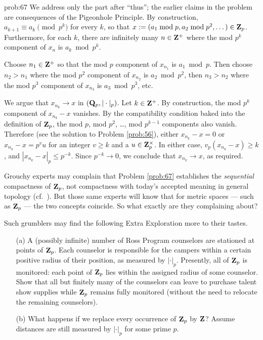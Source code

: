 \begin{sol}{prob:67} We address only the part after ``thus''; the earlier claims in the problem are consequences of the Pigeonhole Principle. By construction, $a_{k+1}\equiv a_k \pmod{p^k}$ for every $k$, so that $x:=(a_1\bmod{p},a_2\bmod{p^2},\dots) \in \mathbf{Z}_p$. Furthermore, for each $k$, there are infinitely many $n \in \mathbf{Z}^{+}$ where the mod $p^k$ component of $x_n$ is $a_k\bmod{p^k}$. 

Choose $n_1 \in \mathbf{Z}^{+}$ so that the mod $p$ component of $x_{n_1}$ is $a_1\bmod{p}$. Then choose $n_2 > n_1$ where the mod $p^2$ component of $x_{n_2}$ is $a_2\bmod{p^2}$, then $n_3 > n_2$ where the mod $p^3$ component of $x_{n_3}$ is $a_3\bmod{p^3}$, etc. 

We argue that $x_{n_k} \to x$ in $(\mathbf{Q}_p,|\cdot|_{p})$. Let $k \in \mathbf{Z}^{+}$. By construction, the mod $p^k$ component of $x_{n_k}-x$ vanishes. By the compatibility condition baked into the definition of $\mathbf{Z}_p$, the mod $p$, mod $p^2$, \dots, mod $p^{k-1}$ components also vanish. Therefore (see the solution to Problem \ref{prob:56}), either $x_{n_k}-x=0$ or $x_{n_k}-x = p^{v} u$ for an integer $v \ge k$ and a $u \in \mathbf{Z}_p^{\times}$. In either case, $v_p(x_{n_k}-x) \ge k$, and $|x_{n_k}-x|_p \le p^{-k}$. Since $p^{-k}\to 0$, we conclude that $x_{n_k}\to x$, as required.
\end{sol}

\begin{rmk} Grouchy experts may complain that Problem \ref{prob:67} establishes the \emph{sequential} compactness of $\mathbf{Z}_p$, not \textsf{compactness} with today's accepted meaning in general topology (cf.~\cite{sundstrom}). But those same experts will know that for metric spaces --- such as $\mathbf{Z}_p$ --- the two concepts coincide. So what exactly are they complaining about?

Such grumblers may find the following Extra Exploration more to their tastes.
\end{rmk}

\begin{challenge}
\vspace{-0.12in}
\begin{enumerate}\item[(a)] A (possibly infinite) number of Ross Program counselors are stationed at points of $\mathbf{Z}_p$. Each counselor is responsible for the campers within a certain positive radius of their position, as measured by $|\cdot|_p$. Presently, all of $\mathbf{Z}_p$ is monitored: each point of $\mathbf{Z}_p$ lies within the assigned radius of some counselor. Show that all but finitely many of the counselors can leave to purchase talent show supplies while $\mathbf{Z}_p$ remains fully monitored (without the need to relocate the remaining counselors).
\item[(b)] What happens if we replace every occurrence of $\mathbf{Z}_p$ by $\mathbf{Z}$? Assume distances are still measured by $|\cdot|_p$ for some prime $p$.
\end{enumerate}
\end{challenge}



